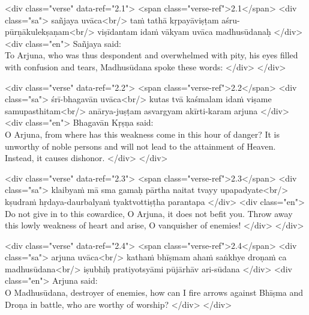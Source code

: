 \begin{html}
<div class="verse" data-ref="2.1">
  <span class="verse-ref">2.1</span>
  <div class="sa">
    sañjaya uvāca<br/>
    taṁ tathā kṛpayāviṣṭam aśru-pūrṇākulekṣaṇam<br/>
    viṣīdantam idaṁ vākyam uvāca madhusūdanaḥ
  </div>
  <div class="en">
    \hspace*{1em}Sañjaya said: \\ To Arjuna, who was thus despondent and overwhelmed with pity, his eyes filled with confusion and tears, Madhusūdana spoke these words:
  </div>
</div>
\end{html}



\begin{html}
<div class="verse" data-ref="2.2">
  <span class="verse-ref">2.2</span>
  <div class="sa">
    śrī-bhagavān uvāca<br/>
    kutas tvā kaśmalam idaṁ viṣame samupasthitam<br/>
    anārya-juṣṭam asvargyam akīrti-karam arjuna
  </div>
  <div class="en">
    \hspace*{1em}Bhagavān Kṛṣṇa said: \\ O Arjuna, from where has this weakness come in this hour of danger? It is unworthy of noble persons and will not lead to the attainment of Heaven. Instead, it causes dishonor.
  </div>
</div>
\end{html}



\begin{html}
<div class="verse" data-ref="2.3">
  <span class="verse-ref">2.3</span>
  <div class="sa">
    klaibyaṁ mā sma gamaḥ pārtha naitat tvayy upapadyate<br/>
    kṣudraṁ hṛdaya-daurbalyaṁ tyaktvottiṣṭha parantapa
  </div>
  <div class="en">
    Do not give in to this cowardice, O Arjuna, it does not befit you. Throw away this lowly weakness of heart and arise, O vanquisher of enemies!
  </div>
</div>
\end{html}



\begin{html}
<div class="verse" data-ref="2.4">
  <span class="verse-ref">2.4</span>
  <div class="sa">
    arjuna uvāca<br/>
    kathaṁ bhīṣmam ahaṁ saṅkhye droṇaṁ ca madhusūdana<br/>
    iṣubhiḥ pratiyotsyāmi pūjārhāv ari-sūdana
  </div>
  <div class="en">
    \hspace*{1em}Arjuna said: \\ O Madhusūdana, destroyer of enemies, how can I fire arrows against Bhīṣma and Droṇa in battle, who are worthy of worship?
  </div>
</div>
\end{html}



